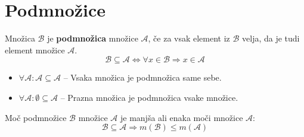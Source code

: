     

    \section{Podmnožice}
        
        Množica $\mathcal{B}$ je \textbf{podmnožica} množice $\mathcal{A}$, če za vsak element iz
        $\mathcal{B}$ velja, da je tudi element množice $\mathcal{A}$.
        $$ \mathcal{B}\subseteq\mathcal{A}\Leftrightarrow\forall x\in\mathcal{B}\Rightarrow x\in\mathcal{A} $$
                

        \begin{figure}[H]   
            \centering         
        \end{figure}


          

            \begin{itemize}
                \item $\forall \mathcal{A}:\mathcal{A}\subseteq\mathcal{A}$ -- Vsaka množica je podmnožica
                    same sebe.
                \item $\forall \mathcal{A}:\emptyset\subseteq\mathcal{A}$ -- Prazna množica je podmnožica
                    vsake množice. \newline
            \end{itemize}
            

            Moč podmnožice $\mathcal{B}$ množice $\mathcal{A}$ je manjša ali enaka moči množice $\mathcal{A}$:
            $$\mathcal{B}\subseteq\mathcal{A}\Rightarrow m(\mathcal{B})\leq m(\mathcal{A})$$

    

